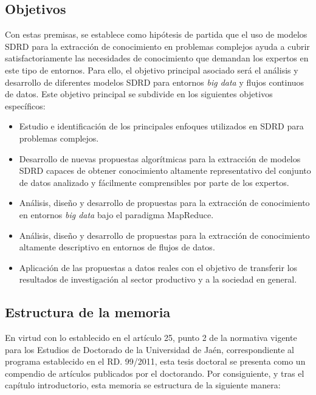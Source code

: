 \documentclass[c5paper,10pt,twoside]{book}	   	%
\begin{document}
\subsection*{Objetivos}

Con estas premisas, se establece como hipótesis de partida que el uso de modelos \ac{SDRD} para la extracción de conocimiento en problemas complejos ayuda a cubrir satisfactoriamente las necesidades de conocimiento que demandan los expertos en este tipo de entornos. Para ello, el objetivo principal asociado será el análisis y desarrollo de diferentes modelos \ac{SDRD} para entornos \textit{big data} y flujos continuos de datos. Este objetivo principal se subdivide en los siguientes objetivos específicos:

\begin{itemize}
	\item Estudio e identificación de los principales enfoques utilizados en \ac{SDRD} para problemas complejos. 
	
	\item Desarrollo de nuevas propuestas algorítmicas para la extracción de modelos \ac{SDRD} capaces de obtener conocimiento altamente representativo del conjunto de datos analizado y fácilmente comprensibles por parte de los expertos. 
	
	\item Análisis, diseño y desarrollo de propuestas para la extracción de conocimiento en entornos \textit{big data} bajo el paradigma MapReduce.
	
	\item Análisis, diseño y desarrollo de propuestas para la extracción de conocimiento altamente descriptivo en entornos de flujos de datos.
	
	\item Aplicación de las propuestas a datos reales con el objetivo de transferir los resultados de investigación al sector productivo y a la sociedad en general.
\end{itemize}


\subsection*{Estructura de la memoria}

En virtud con lo establecido en el artículo 25, punto 2 de la normativa vigente para los Estudios de Doctorado de la Universidad de Jaén, correspondiente al programa establecido en el RD. 99/2011, esta tesis doctoral se presenta como un compendio de artículos publicados por el doctorando. Por consiguiente, y tras el capítulo introductorio, esta memoria se estructura de la siguiente manera:
\end{document}
